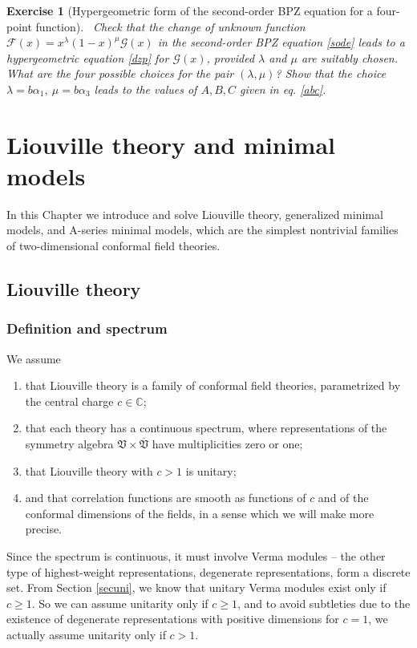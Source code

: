 \documentclass[12pt, a4paper, notitlepage, twoside]{report}
\numberwithin{equation}{section}
\theoremstyle{break}
\newtheorem{exo}{Exercise}[chapter]
\begin{document}
\begin{exo}[Hypergeometric form of the second-order BPZ equation for a four-point function]
 ~\label{exohge}
 Check that the change of unknown function $\mathcal{F}(x)=x^{\lambda}(1-x)^{\mu}\mathcal{G}(x)$ in the second-order BPZ equation \eqref{sode} leads to a hypergeometric equation \eqref{dzp} for $\mathcal{G}(x)$, provided $\lambda$ and $\mu$ are suitably chosen.
What are the four possible choices for the pair $(\lambda,\mu)$?
Show that the choice $\lambda=b\alpha_1,\ \mu=b\alpha_3$ leads to the values of $A,B,C$ given in eq. \eqref{abc}. 
\end{exo}



\cleardoublepage

\chapter{Liouville theory and minimal models \label{seccbm}}

In this Chapter we introduce and solve Liouville theory, generalized minimal models, and A-series minimal models, which are the simplest nontrivial families of two-dimensional conformal field theories. 

\section{Liouville theory \label{secliou}}

\subsection{Definition and spectrum \label{secspe}}

We assume 
\begin{enumerate}
 \item that Liouville theory is a family of conformal field theories, parametrized by the central charge $c\in\mathbb{C}$;
\item that each theory has a continuous spectrum, where representations of the symmetry algebra $\mathfrak{V}\times\overline{\mathfrak{V}}$ have multiplicities zero or one;
\item that Liouville theory with $c>1$ is unitary;
\item and that correlation functions are smooth as functions of $c$ and of the conformal dimensions of the fields, in a sense which we will make more precise.
\end{enumerate}
Since the spectrum is continuous, it must involve Verma modules -- the other type of highest-weight representations, degenerate representations, form a discrete set. 
From Section \ref{secuni}, we know that unitary Verma modules exist only if $c\geq 1$. 
So we can assume unitarity only if $c\geq 1$, and to avoid subtleties due to the existence of degenerate representations with positive dimensions for $c=1$, we actually assume unitarity only if $c>1$. 
\end{document}
